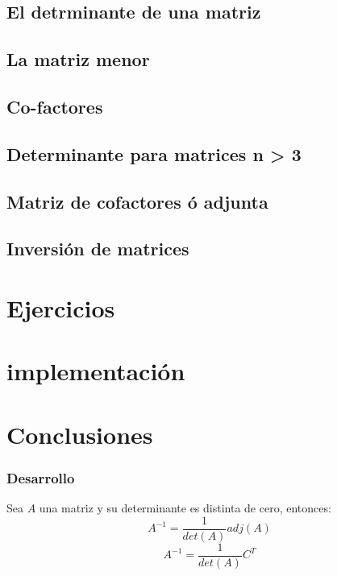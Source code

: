 \documentclass{beamer}
\begin{document}
    \subsection{El detrminante de una matriz}
    \subsection{La matriz menor}
    \subsection{Co-factores}
    \subsection{Determinante para matrices n > 3}
    \subsection{Matriz de cofactores ó adjunta}
    \subsection{Inversión de matrices}
    \section{Ejercicios}
    \section{implementación}
    \section{Conclusiones}

    \begin{frame}
        \frametitle{Desarrollo}
        Sea $A$ una matriz y su determinante es distinta de cero, entonces:
        $$
        A^{-1} = \frac{1}{det(A)}adj(A)
        $$
        $$
        A^{-1} = \frac{1}{det(A)}C^{T}
        $$

    \end{frame}
\end{document}
